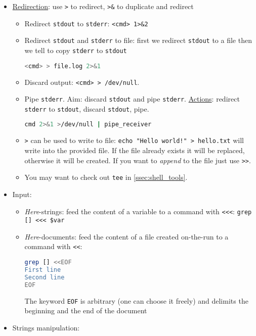 \documentclass[a4paper,12pt,%
              final%
              ]{article}
\begin{document}
\begin{itemize}
  \item \href{https://www.gnu.org/software/bash/manual/bash.html#Redirections}{Redirection}: use \verb|>| to redirect, \verb|>&| to duplicate and redirect
    \begin{itemize}
      \item Redirect \texttt{stdout} to \texttt{stderr}: \verb|<cmd> 1>&2|
      \item Redirect \texttt{stdout} and \texttt{stderr} to file: first we redirect \texttt{stdout} to a file then we tell to copy \texttt{stderr} to \texttt{stdout}
\begin{lstlisting}[language=bash]
<cmd> > file.log 2>&1
\end{lstlisting}
      \item Discard output: \texttt{<cmd> > /dev/null}.
      \item Pipe \texttt{stderr}. Aim: discard \texttt{stdout} and pipe \texttt{stderr}. \href{https://stackoverflow.com/questions/2342826/how-can-i-pipe-stderr-and-not-stdout}{Actions}: redirect \texttt{stderr} to \texttt{stdout}, discard \texttt{stdout}, pipe.
\begin{lstlisting}[language=bash]
cmd 2>&1 >/dev/null | pipe_receiver
\end{lstlisting}
      \item \verb|>| can be used to write to file: \verb|echo "Hello world!" > hello.txt| will write into the provided file. If the file already exists it will be replaced, otherwise it will be created. If you want to \emph{append} to the file just use \verb|>>|.
      \item You may want to check out \texttt{tee} in \ref{ssec:shell_tools}.
    \end{itemize}
  \item Input:
    \begin{itemize}
      \item \emph{Here}-strings: feed the content of a variable to a command with \verb|<<<|: \verb|grep [] <<< $var|
      \item \emph{Here}-documents: feed the content of a file created on-the-run to a command with  \verb|<<|:
\begin{lstlisting}[language=bash]
grep [] <<EOF
First line
Second line
EOF
\end{lstlisting}
        The keyword \texttt{EOF} is arbitrary (one can choose it freely) and delimits the beginning and the end of the document
    \end{itemize}
  \item Strings manipulation:

\end{itemize}
\end{document}
